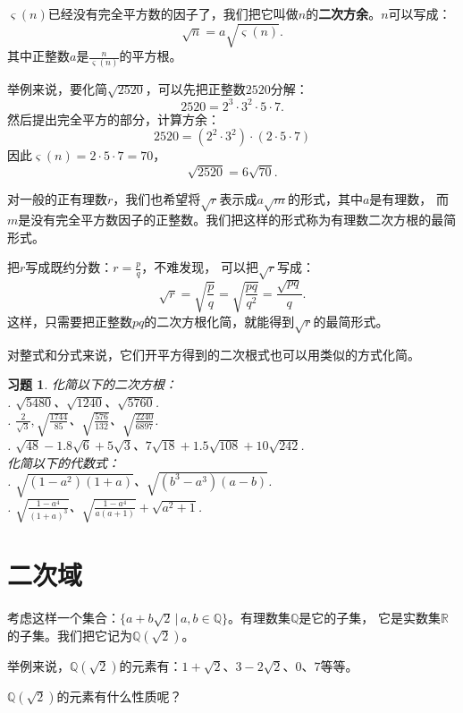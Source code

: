 \documentclass[12pt,UTF8]{ctexbook}
\newtheorem{xt}{习题}[section]
\begin{document}
$\varsigma(n)$已经没有完全平方数的因子了，我们把它叫做$n$的\textbf{二次方余}。$n$可以写成：
$$ \sqrt{n} = a\sqrt{\varsigma(n)}.$$
其中正整数$a$是$\frac{n}{\varsigma(n)}$的平方根。

举例来说，要化简$\sqrt{2520}$，可以先把正整数$2520$分解：
$$ 2520 = 2^3 \cdot 3^2 \cdot 5 \cdot 7.$$
然后提出完全平方的部分，计算方余：
$$ 2520 = \left(2^2 \cdot 3^2 \right) \cdot (2 \cdot 5 \cdot 7)$$
因此$\varsigma(n) = 2 \cdot 5 \cdot 7 = 70$，
$$ \sqrt{2520} = 6 \sqrt{70}.$$

对一般的正有理数$r$，我们也希望将$\sqrt{r}$表示成$a\sqrt{m}$的形式，其中$a$是有理数，
而$m$是没有完全平方数因子的正整数。我们把这样的形式称为有理数二次方根的最简形式。

把$r$写成既约分数：$r = \frac{p}{q}$，不难发现，
可以把$\sqrt{r}$写成：
$$ \sqrt{r} = \sqrt{\frac{p}{q}} = \sqrt{\frac{pq}{q^2}} = \frac{\sqrt{pq}}{q}.$$
这样，只需要把正整数$pq$的二次方根化简，就能得到$\sqrt{r}$的最简形式。

对整式和分式来说，它们开平方得到的二次根式也可以用类似的方式化简。

\begin{xt}\label{xt:3-0-0}
    化简以下的二次方根：\\
    . $\sqrt{5480}$、$\sqrt{1240}$、$\sqrt{5760}$.\\
    . $\frac{2}{\sqrt{3}}, \sqrt{\frac{1744}{85}}$、$\sqrt{\frac{576}{132}}$、$\sqrt{\frac{2240}{6897}}$.\\
    . $\sqrt{48} - 1.8\sqrt{6} + 5\sqrt{3}$、$7\sqrt{18} + 1.5\sqrt{108} + 10\sqrt{242}$.\\
    化简以下的代数式：\\
    . $\sqrt{(1 - a^2)(1 + a)}$、$\sqrt{(b^3 - a^3)(a - b)}$.\\
    . $\sqrt{\frac{1 - a^4}{(1 + a)^3}}$、$\sqrt{\frac{1 - a^4}{a(a+1)}} + \sqrt{a^2+1}$.
\end{xt}

\section{二次域}
考虑这样一个集合：$\{a + b\sqrt{2} \, | \, a, b \in\mathbb{Q}\}$。有理数集$\mathbb{Q}$是它的子集，
它是实数集$\mathbb{R}$的子集。我们把它记为$\mathbb{Q}(\sqrt{2})$。

举例来说，$\mathbb{Q}(\sqrt{2})$的元素有：$1 + \sqrt{2}$、$3 - 2\sqrt{2}$、$0$、$7$等等。

$\mathbb{Q}(\sqrt{2})$的元素有什么性质呢？
\end{document}
